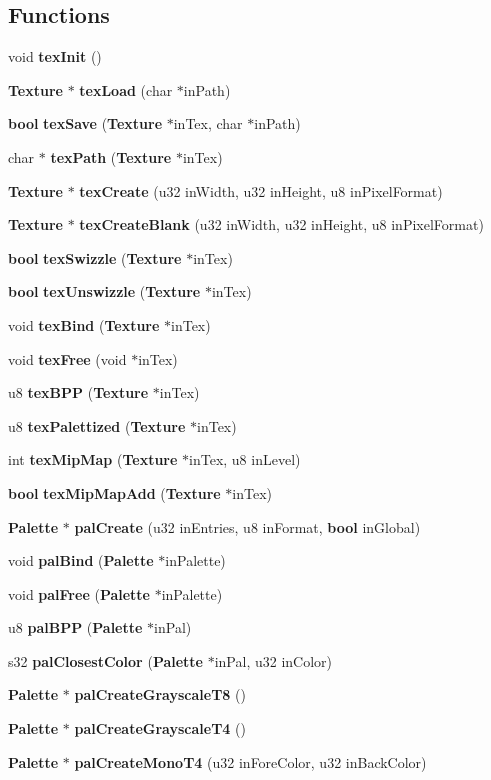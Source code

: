 \subsection*{Functions}
\begin{CompactItemize}
\item 
void {\bf tex\-Init} ()
\item 
{\bf Texture} $\ast$ {\bf tex\-Load} (char $\ast$in\-Path)
\item 
{\bf bool} {\bf tex\-Save} ({\bf Texture} $\ast$in\-Tex, char $\ast$in\-Path)
\item 
char $\ast$ {\bf tex\-Path} ({\bf Texture} $\ast$in\-Tex)
\item 
{\bf Texture} $\ast$ {\bf tex\-Create} (u32 in\-Width, u32 in\-Height, u8 in\-Pixel\-Format)
\item 
{\bf Texture} $\ast$ {\bf tex\-Create\-Blank} (u32 in\-Width, u32 in\-Height, u8 in\-Pixel\-Format)
\item 
{\bf bool} {\bf tex\-Swizzle} ({\bf Texture} $\ast$in\-Tex)
\item 
{\bf bool} {\bf tex\-Unswizzle} ({\bf Texture} $\ast$in\-Tex)
\item 
void {\bf tex\-Bind} ({\bf Texture} $\ast$in\-Tex)
\item 
void {\bf tex\-Free} (void $\ast$in\-Tex)
\item 
u8 {\bf tex\-BPP} ({\bf Texture} $\ast$in\-Tex)
\item 
u8 {\bf tex\-Palettized} ({\bf Texture} $\ast$in\-Tex)
\item 
int {\bf tex\-Mip\-Map} ({\bf Texture} $\ast$in\-Tex, u8 in\-Level)
\item 
{\bf bool} {\bf tex\-Mip\-Map\-Add} ({\bf Texture} $\ast$in\-Tex)
\item 
{\bf Palette} $\ast$ {\bf pal\-Create} (u32 in\-Entries, u8 in\-Format, {\bf bool} in\-Global)
\item 
void {\bf pal\-Bind} ({\bf Palette} $\ast$in\-Palette)
\item 
void {\bf pal\-Free} ({\bf Palette} $\ast$in\-Palette)
\item 
u8 {\bf pal\-BPP} ({\bf Palette} $\ast$in\-Pal)
\item 
s32 {\bf pal\-Closest\-Color} ({\bf Palette} $\ast$in\-Pal, u32 in\-Color)
\item 
{\bf Palette} $\ast$ {\bf pal\-Create\-Grayscale\-T8} ()
\item 
{\bf Palette} $\ast$ {\bf pal\-Create\-Grayscale\-T4} ()
\item 
{\bf Palette} $\ast$ {\bf pal\-Create\-Mono\-T4} (u32 in\-Fore\-Color, u32 in\-Back\-Color)

\end{CompactItemize}
